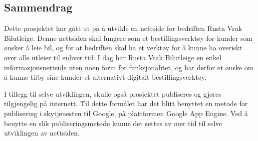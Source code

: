 \documentclass[11pt, oneside]{Thesis} %
\begin{document}
\begin{adjustwidth*}{2cm}{2cm}
\let\clearpage\relax
\chapter{Sammendrag}
Dette prosjektet har gått ut på å utvikle en nettside for bedriften Rusta Vrak Bilutleige. Denne nettsiden skal fungere som et bestillingsverktøy for kunder som ønsker å leie bil, og for at bedriften skal ha et verktøy for å kunne ha overiskt over alle utleier til enhver tid. I dag har Rusta Vrak Bilutleige en enkel informasjonsnettside uten noen form for funksjonalitet, og har derfor et ønske om å kunne tilby sine kunder et alternativt digitalt bestillingsverktøy.
 
 
I tillegg til selve utviklingen, skulle også prosjektet publiseres og gjøres tilgjengelig på internett. Til dette formålet har det blitt benyttet en metode for publisering i skytjenesten til Google, på plattformen Google App Engine. Ved å benytte en slik publiseringsmetode kunne det settes av mer tid til selve utviklingen av nettsiden.



\end{adjustwidth*}




\newpage

\pagestyle{fancy} %

\tableofcontents %

\listoffigures %


\end{document}

